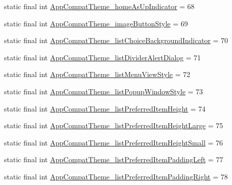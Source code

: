 \begin{DoxyCompactItemize}
static final int \mbox{\hyperlink{classandroid_1_1support_1_1v7_1_1appcompat_1_1_r_1_1styleable_abae608ec756d9a4d7cf7670ef6cfe4c6}{App\+Compat\+Theme\+\_\+home\+As\+Up\+Indicator}} = 68
\item 
static final int \mbox{\hyperlink{classandroid_1_1support_1_1v7_1_1appcompat_1_1_r_1_1styleable_a98ddc290b2241001d5640b6cd997eab4}{App\+Compat\+Theme\+\_\+image\+Button\+Style}} = 69
\item 
static final int \mbox{\hyperlink{classandroid_1_1support_1_1v7_1_1appcompat_1_1_r_1_1styleable_a60fbf3d8975c1e56e883d17ff05d98ad}{App\+Compat\+Theme\+\_\+list\+Choice\+Background\+Indicator}} = 70
\item 
static final int \mbox{\hyperlink{classandroid_1_1support_1_1v7_1_1appcompat_1_1_r_1_1styleable_aae9d405e90740f2f6f987955feaa32f2}{App\+Compat\+Theme\+\_\+list\+Divider\+Alert\+Dialog}} = 71
\item 
static final int \mbox{\hyperlink{classandroid_1_1support_1_1v7_1_1appcompat_1_1_r_1_1styleable_a4ff65c3e1b1be5e23858db62f145d10c}{App\+Compat\+Theme\+\_\+list\+Menu\+View\+Style}} = 72
\item 
static final int \mbox{\hyperlink{classandroid_1_1support_1_1v7_1_1appcompat_1_1_r_1_1styleable_a0a5b73e4553fdefa53e1fa4a369ce301}{App\+Compat\+Theme\+\_\+list\+Popup\+Window\+Style}} = 73
\item 
static final int \mbox{\hyperlink{classandroid_1_1support_1_1v7_1_1appcompat_1_1_r_1_1styleable_ad99b1fc557ff371142217308a4145277}{App\+Compat\+Theme\+\_\+list\+Preferred\+Item\+Height}} = 74
\item 
static final int \mbox{\hyperlink{classandroid_1_1support_1_1v7_1_1appcompat_1_1_r_1_1styleable_a8e35868188c499d99123afea2d2d8bea}{App\+Compat\+Theme\+\_\+list\+Preferred\+Item\+Height\+Large}} = 75
\item 
static final int \mbox{\hyperlink{classandroid_1_1support_1_1v7_1_1appcompat_1_1_r_1_1styleable_a09953a6247da1828a0a8951d716f0f28}{App\+Compat\+Theme\+\_\+list\+Preferred\+Item\+Height\+Small}} = 76
\item 
static final int \mbox{\hyperlink{classandroid_1_1support_1_1v7_1_1appcompat_1_1_r_1_1styleable_a6b1c55e5a463f9a77c6666042d507197}{App\+Compat\+Theme\+\_\+list\+Preferred\+Item\+Padding\+Left}} = 77
\item 
static final int \mbox{\hyperlink{classandroid_1_1support_1_1v7_1_1appcompat_1_1_r_1_1styleable_ac45d9e166bf94d921a4fc7fa030ccac4}{App\+Compat\+Theme\+\_\+list\+Preferred\+Item\+Padding\+Right}} = 78
\item 

\end{DoxyCompactItemize}
